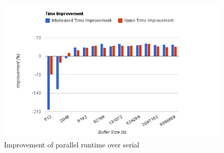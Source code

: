 \documentclass[twocolumn]{article}
\begin{document}
  \begin{figure}
    \includegraphics[width=\columnwidth]{improvements}
    \caption{Improvement of parallel runtime over serial}
  \end{figure}
  
  
\end{document}
